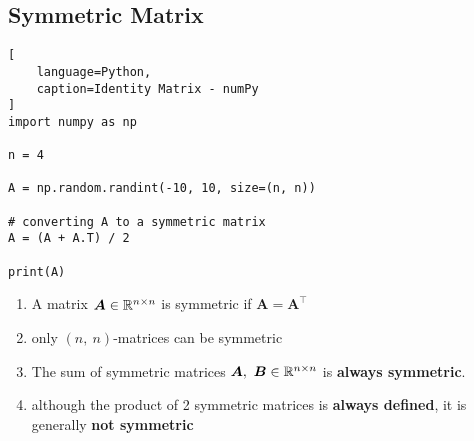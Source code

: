 \subsection{Symmetric Matrix}

\begin{lstlisting}[
    language=Python,
    caption=Identity Matrix - numPy
]
import numpy as np

n = 4

A = np.random.randint(-10, 10, size=(n, n))

# converting A to a symmetric matrix
A = (A + A.T) / 2

print(A)
\end{lstlisting}

\begin{enumerate}
    \item A matrix $\bm{A} \in \mathbb{R}^{n\times n}$ is symmetric if $\bm{A} = \bm{A}^\top$
    \hfill \cite{mfml/book/mml/Deisenroth-Faisal-Ong}
    
    \item only $(n,\ n)$-matrices can be symmetric
    \hfill \cite{mfml/book/mml/Deisenroth-Faisal-Ong}

    \item The sum of symmetric matrices $\bm{A},\ \bm{B} \in \mbbR^{n\times n}$ is \textbf{always symmetric}. 
    \hfill \cite{mfml/book/mml/Deisenroth-Faisal-Ong}

    \item although the product of 2 symmetric matrices is \textbf{always defined}, it is generally \textbf{not symmetric}
    \hfill \cite{mfml/book/mml/Deisenroth-Faisal-Ong}
\end{enumerate}








